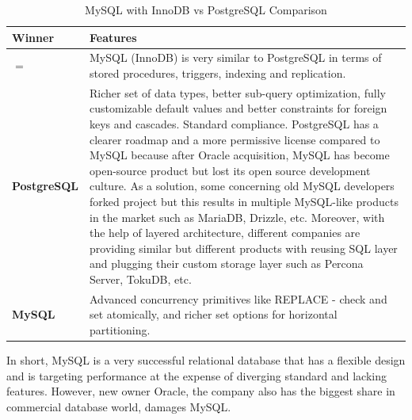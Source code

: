 \begin{table}[H]
  \centering
  \caption{MySQL with InnoDB vs PostgreSQL Comparison}
  \renewcommand{\arraystretch}{1.5}
  \begin{tabular}{| >{\centering\bfseries}m{1in} | >{\centering\arraybackslash}m{4.5in} |}
	\hline
    \textbf{Winner} & \textbf{Features} \\
	\hline
    $=$ & MySQL (InnoDB) is very similar to PostgreSQL in terms of stored procedures, triggers, indexing and replication. \\ \hline
    PostgreSQL & Richer set of data types, better sub-query optimization, fully customizable default values and better constraints for foreign keys and cascades. Standard compliance. PostgreSQL has a clearer roadmap and a more permissive license compared to MySQL because after Oracle acquisition, MySQL has become open-source product but lost its open source development culture. As a solution, some concerning old MySQL developers forked project but this results in multiple MySQL-like products in the market such as MariaDB, Drizzle, etc. Moreover, with the help of layered architecture, different companies are providing similar but different products with reusing SQL layer and plugging their custom storage layer such as Percona Server, TokuDB, etc. \\ \hline
    MySQL & Advanced concurrency primitives like REPLACE - check and set atomically, and richer set options for horizontal partitioning. \\ \hline    
  \end{tabular}
  \label{mysql}
\end{table}

In short, MySQL is a very successful relational database that has a flexible design and is targeting performance at the expense of diverging standard and lacking features. However, new owner Oracle, the company also has the biggest share in commercial database world, damages MySQL.

